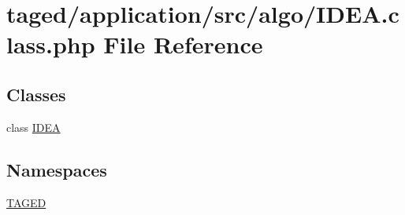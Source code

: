 \hypertarget{_i_d_e_a_8class_8php}{}\section{taged/application/src/algo/\+I\+D\+EA.class.\+php File Reference}
\label{_i_d_e_a_8class_8php}
\subsection*{Classes}
\begin{DoxyCompactItemize}
\item 
class \hyperlink{class_i_d_e_a}{I\+D\+EA}
\end{DoxyCompactItemize}
\subsection*{Namespaces}
\begin{DoxyCompactItemize}
\item 
 \hyperlink{namespace_t_a_g_e_d}{T\+A\+G\+ED}
\end{DoxyCompactItemize}
